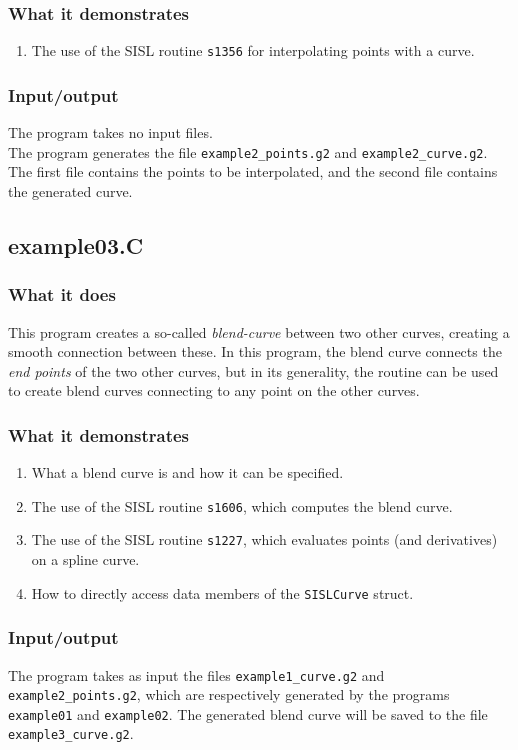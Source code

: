 \subsubsection{What it demonstrates}
\begin{enumerate}
\item The use of the SISL routine \verb/s1356/ for interpolating points with a curve.
\end{enumerate}
\subsubsection{Input/output}
The program takes no input files.\\
The program generates the file \verb/example2_points.g2/ and \verb/example2_curve.g2/.
The first file contains the points to be interpolated, and the second file contains the
generated curve.

\subsection{example03.C}

\subsubsection{What it does}
This program creates a so-called \emph{blend-curve} between two other curves, creating a
smooth connection between these.  In this program, the blend curve connects the \emph{end 
points} of the two other curves, but in its generality, the routine can be used to create 
blend curves connecting to any point on the other curves.

\subsubsection{What it demonstrates}
\begin{enumerate}
\item What a blend curve is and how it can be specified.
\item The use of the SISL routine \verb/s1606/, which computes the blend curve.
\item The use of the SISL routine \verb/s1227/, which evaluates points (and derivatives)
on a spline curve.
\item How to directly access data members of the \verb/SISLCurve/ struct.
\end{enumerate}
\subsubsection{Input/output}
The program takes as input the files \verb/example1_curve.g2/ and \verb/example2_points.g2/,
which are respectively generated by the programs \verb/example01/ and \verb/example02/.
The generated blend curve will be saved to the file \verb/example3_curve.g2/.

